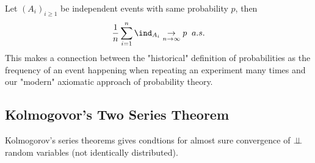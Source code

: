 \documentclass[../main.tex]{subfiles}
\begin{document}
  \begin{application}
    Let $(A_i)_{i \geq 1}$ be independent events with same probability $p$, then
    \[
      \frac{1}{n} \sum_{i = 1}^n \ind_{A_i} \underset{n \to \infty}{\to} p \;\;
      a.s.
    \] 
  This makes a connection between the "historical" definition of probabilities
    as the frequency of an event happening when repeating an experiment many
    times and our "modern" axiomatic approach of probability theory.
  \end{application}

  \subsection{Kolmogovor's Two Series Theorem}

  Kolmogorov's series theorems gives condtions for almost sure convergence of
  $\perp\!\!\!\!\,\perp$ random variables (not identically distributed).
\end{document}
